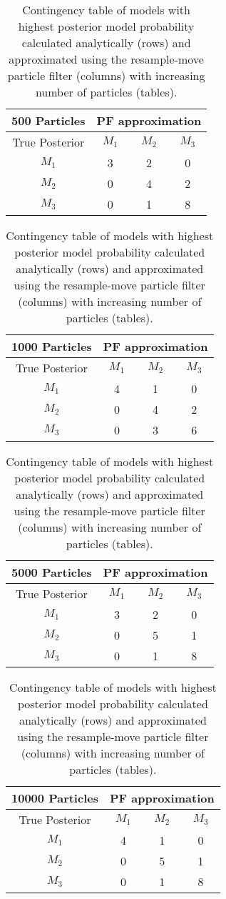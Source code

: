 \documentclass{article}
\begin{document}
\begin{table}[h]
\centering
\caption{Contingency table of models with highest posterior model probability calculated analytically (rows) and approximated using the resample-move particle filter (columns) with increasing number of particles (tables).} \label{tab:cont}
\begin{tabular}{|c|c|c|c|}
  \hline
{\bf 500 Particles} & \multicolumn{3}{|c|}{PF approximation} \\
 \hline
 True Posterior & $M_1$& $M_2$ & $M_3$ \\
  \hline
$M_1$ &    3 &   2 &   0 \\
\hline
$M_2$ &   0 &   4 &   2 \\
\hline
$M_3$ &   0 &   1 &   8 \\
   \hline
\end{tabular}
\quad
\begin{tabular}{|c|c|c|c|}
  \hline
{\bf 1000 Particles} & \multicolumn{3}{|c|}{PF approximation} \\
 \hline
 True Posterior & $M_1$& $M_2$ & $M_3$ \\
  \hline
$M_1$ &     4 &   1 &   0 \\
\hline
$M_2$ &    0 &   4 &   2 \\
\hline
$M_3$ &   0 &   3 &   6 \\
   \hline
\end{tabular}
\quad
\begin{tabular}{|c|c|c|c|}
  \hline
{\bf 5000 Particles} & \multicolumn{3}{|c|}{PF approximation} \\
 \hline
 True Posterior & $M_1$& $M_2$ & $M_3$ \\
  \hline
$M_1$ &    3 &   2 &   0 \\
\hline
  $M_2$ & 0 &   5 &   1 \\
  \hline
  $M_3$ &    0 &   1 &   8 \\
   \hline
\end{tabular}
\quad
\begin{tabular}{|c|c|c|c|}
  \hline
{\bf 10000 Particles} & \multicolumn{3}{|c|}{PF approximation} \\
 \hline
 True Posterior & $M_1$& $M_2$ & $M_3$ \\
  \hline
$M_1$ &  4 &   1 &   0 \\
  \hline
  $M_2$ &   0 &   5 &   1 \\
  \hline
  $M_3$ &    0 &   1 &   8 \\
   \hline
\end{tabular}
\end{table}
\end{document}
